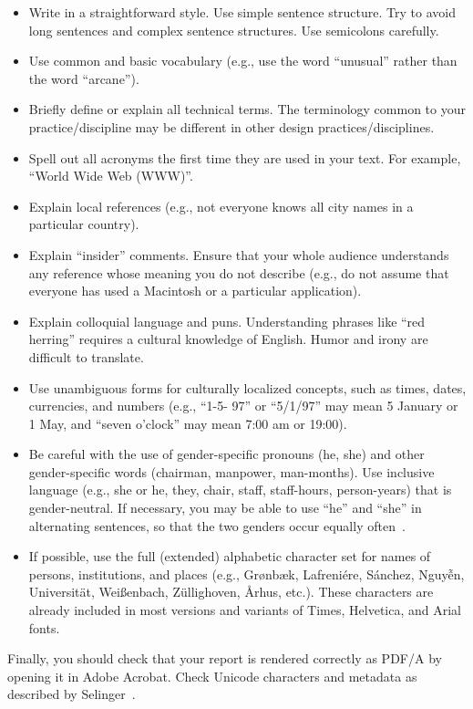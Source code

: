\documentclass{article}
\begin{document}
\begin{itemize}
\item Write in a straightforward style. Use simple sentence
  structure. Try to avoid long sentences and complex sentence
  structures. Use semicolons carefully.
\item Use common and basic vocabulary (e.g., use the word ``unusual''
  rather than the word ``arcane'').
\item Briefly define or explain all technical terms. The terminology
  common to your practice/discipline may be different in other design
  practices/disciplines.
\item Spell out all acronyms the first time they are used in your
  text. For example, ``World Wide Web (WWW)''.
\item Explain local references (e.g., not everyone knows all city
  names in a particular country).
\item Explain ``insider'' comments. Ensure that your whole audience
  understands any reference whose meaning you do not describe (e.g.,
  do not assume that everyone has used a Macintosh or a particular
  application).
\item Explain colloquial language and puns. Understanding phrases like
  ``red herring'' requires a cultural knowledge of English. Humor and
  irony are difficult to translate.
\item Use unambiguous forms for culturally localized concepts, such as
  times, dates, currencies, and numbers (e.g., ``1-5- 97'' or
  ``5/1/97'' may mean 5 January or 1 May, and ``seven o'clock'' may
  mean 7:00 am or 19:00).
\item Be careful with the use of gender-specific pronouns (he, she)
  and other gender-specific words (chairman, manpower,
  man-months). Use inclusive language (e.g., she or he, they, chair,
  staff, staff-hours, person-years) that is gender-neutral. If
  necessary, you may be able to use ``he'' and ``she'' in alternating
  sentences, so that the two genders occur equally
  often~\cite{Schwartz:1995:GBF}.
\item If possible, use the full (extended) alphabetic character set
  for names of persons, institutions, and places (e.g.,
  Gr{\o}nb{\ae}k, Lafreni\'ere, S\'anchez, Nguy{\~{\^{e}}}n,
  Universit{\"a}t, Wei{\ss}enbach, Z{\"u}llighoven, \r{A}rhus, etc.).
  These characters are already included in most versions and variants
  of Times, Helvetica, and Arial fonts.
\end{itemize}

Finally, you should check that your report is rendered correctly as PDF/A by opening it in Adobe Acrobat. Check Unicode characters and metadata as described by Selinger~\cite{Selinger:pdfa}.
\end{document}
